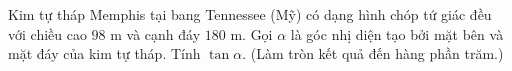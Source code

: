\begin{ex}
Kim tự tháp Memphis tại bang Tennessee (Mỹ) có dạng hình chóp tứ giác đều với chiều cao $98$ m và cạnh đáy $180$ m. Gọi $\alpha$ là góc nhị diện tạo bởi mặt bên và mặt đáy của kim tự tháp. Tính $\tan\alpha$. (Làm tròn kết quả đến hàng phần trăm.)
\end{ex}

